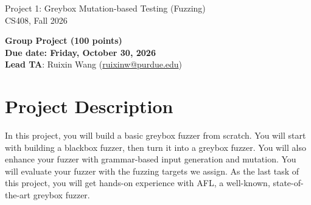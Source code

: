 \documentclass[letterpaper,11pt]{article}
\begin{document}
\begin{center}
    {\LARGE{Project 1: Greybox Mutation-based Testing (Fuzzing)}}\\
	\vspace*{10pt}
	{\Large{CS408, Fall 2026}}\\
    \vspace*{10pt}

  {\large{\textbf{Group Project (100 points)\\
        Due date: Friday, October 30, 2026}}}\\
      \vspace*{15pt}
      \textbf{Lead TA}: Ruixin Wang (\href{mailto:ruixinw@purdue.edu}{ruixinw@purdue.edu})
\end{center}













\section{Project Description}

In this project, you will build a basic greybox fuzzer from scratch.
You will start with building a blackbox fuzzer, then turn it into a greybox fuzzer.
You will also enhance your fuzzer with grammar-based input generation and mutation.
You will evaluate your fuzzer with the fuzzing targets we assign.
As the last task of this project, you will get hands-on experience with AFL, a well-known, state-of-the-art greybox fuzzer.

\end{document}
